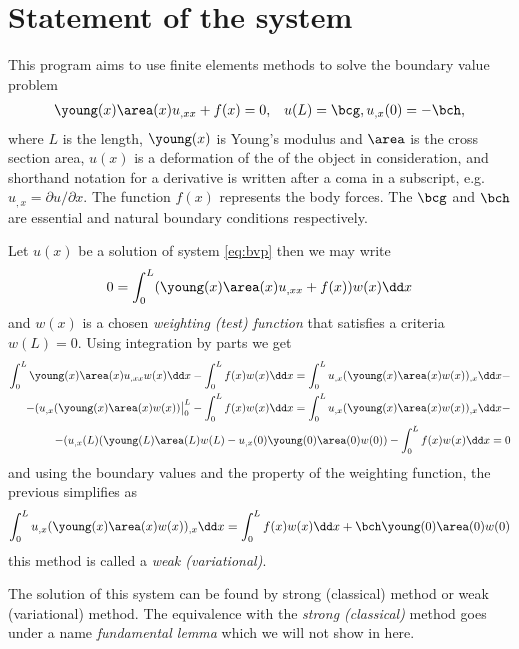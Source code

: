 \documentclass[twoside,a4paper,12pt]{article}
\newcommand{\+}[2]{\newcommand#1{{\color{\notcolor}#2}}}
\newcommand{\1}[2]{\newcommand{#1}[1]{{\color{\notcolor}#2}}}
\newcommand{\2}[2]{\newcommand{#1}[2]{{\color{\notcolor}#2}}}
\begin{document}
\section{Statement of the system}

This program aims to use finite elements methods to solve the boundary
value problem
%
\begin{align}
  \young(x) \area(x) u_{,xx} + f(x) = 0, \label{eq:bvp}
  &&u(L) = \bcg, u_{,x}(0) = -\bch,
\end{align}
where $L$ is the length, $\young(x)$ is Young's modulus and $\area$ is
the cross section area, $u(x)$ is a deformation of the of the object
in consideration, and shorthand notation for a derivative is written
after a coma in a subscript, e.g. $u_{,x} = \partial u /\partial x$.  The
function $f(x)$ represents the body forces. The $\bcg$ and $\bch$ are
essential and natural boundary conditions respectively.

Let $u(x)$ be a solution of system \eqref{eq:bvp} then we may write
%
\begin{align}
  0 = \int_0^L (\young(x) \area(x) u_{,xx} + f(x)) w(x) \dd x 
\end{align}
and $w(x)$ is a chosen \emph{weighting (test) function} that satisfies a
criteria $w(L)=0$.
%
Using integration by parts we get
%
\begin{align}
  \int_0^L \young(x) \area(x) u_{,xx} w(x) \dd x 
  -\int_0^L f(x) w(x) \dd x  =
   \int_0^L u_{,x} (\young(x) \area(x) w(x))_{,x} \dd x -\nonumber \\ -
  (u_{,x} (\young(x) \area(x)  w(x))\big|_0^L -
  \int_0^L f(x) w(x) \dd x =  
  \int_0^L u_{,x} (\young(x) \area(x) w(x))_{,x} \dd x -\nonumber \\ -
  (u_{,x}(L) (\young(L) \area(L)  w(L) -
  u_{,x}(0) \young(0) \area(0)  w(0)) 
  -\int_0^L f(x) w(x) \dd x = 0
\end{align}
%
and using the boundary values and the property of the weighting
function, the previous simplifies as
%
\begin{align}
  \int_0^L u_{,x} (\young(x) \area(x) w(x))_{,x} \dd x =  
  \int_0^L f(x) w(x) \dd x + \bch \young(0) \area(0)  w(0)
  \label{eq:weak-exact}
\end{align}
%
this method is called a \emph{weak (variational)}.

The solution of this system can be found by strong (classical) method
or weak (variational) method. The equivalence with the \emph{strong
  (classical)} method goes under a name \emph{fundamental lemma} which we will not show in here.
\end{document}
